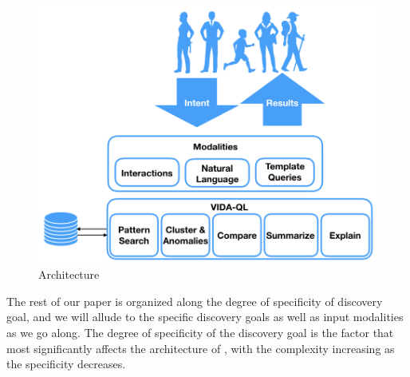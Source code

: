 \begin{figure}
\centering
\includegraphics[width=\linewidth]{figures/VIDA_architecture.png}
\vspace{-10pt}
\caption{\vida Architecture\label{fig:vida_architecture}
\vspace{-15pt}
}
\end{figure}





\par
{}
The rest of our paper is organized along the degree of specificity
of discovery goal, and we will allude to the specific discovery
goals as well as input modalities as we go along. 
The degree of specificity of the discovery goal is the factor
that most significantly affects the architecture of \vida,
with the complexity increasing as the specificity decreases. 

